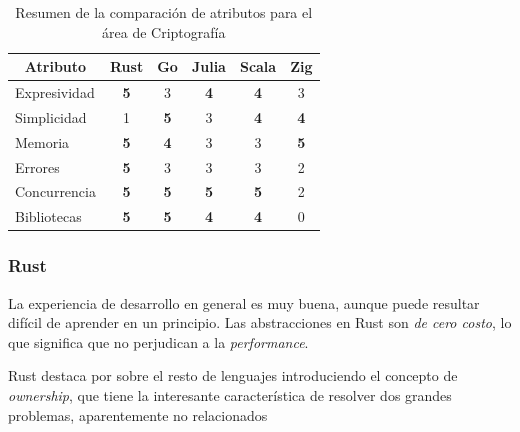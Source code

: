 \documentclass[11pt]{article}
\let\Oldsubsubsection\subsubsection
\renewcommand{\subsubsection}{\FloatBarrier\Oldsubsubsection}
\newcommand{\badMetric}[1]{{\color{BrickRed}#1}}
\newcommand{\goodMetric}[1]{{\textbf{#1}}}
\newcommand{\english}[1]{\textit{#1}}
\newcommand{\technical}[1]{\textit{#1}}
\begin{document}
\begin{table}[h]
\centering
\begin{tabular}{|l|c|c|c|c|c|}
\hline
\multicolumn{1}{|c|}{Atributo} & Rust & Go & Julia & Scala & Zig \\ \hline
Expresividad & \goodMetric{5} & 3 & \goodMetric{4} & \goodMetric{4} & 3 \\ \hline
Simplicidad & \badMetric{1} & \goodMetric{5} & 3 & \goodMetric{4} & \goodMetric{4} \\ \hline
Memoria & \goodMetric{5} & \goodMetric{4} & 3 & 3 & \goodMetric{5} \\ \hline
Errores & \goodMetric{5} & 3 & 3 & 3 & \badMetric{2} \\ \hline
Concurrencia & \goodMetric{5} & \goodMetric{5} & \goodMetric{5} & \goodMetric{5} & \badMetric{2} \\ \hline
Bibliotecas & \goodMetric{5} & \goodMetric{5} & \goodMetric{4} & \goodMetric{4} & \badMetric{0} \\ \hline
\end{tabular}
\caption{Resumen de la comparación de atributos para el área de Criptografía}
\label{tab:aes:experiences}
\end{table}

\subsubsection{Rust}

La experiencia de desarrollo en general es muy buena, aunque puede resultar difícil de aprender en un principio. Las abstracciones en Rust son \technical{de cero costo}, lo que significa que no perjudican a la \english{performance}.

Rust destaca por sobre el resto de lenguajes introduciendo el concepto de \english{ownership}, que tiene la interesante característica de resolver dos grandes problemas, aparentemente no relacionados
\end{document}
